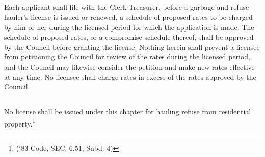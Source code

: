 \subsection{}
Each applicant shall file with the Clerk-Treasurer, before a garbage and refuse hauler’s license is issued or renewed, a schedule of proposed rates to be charged by him or her during the licensed period for which the application is made.  The schedule of proposed rates, or a compromise schedule thereof, shall be approved by the Council before granting the license.  Nothing herein shall prevent a licensee from petitioning the Council for review of the rates during the licensed period, and the Council may likewise consider the petition and make new rates effective at any time.  No licensee shall charge rates in excess of the rates approved by the Council.
\subsection{}
No license shall be issued under this chapter for hauling refuse from residential property.\footnote{(‘83 Code, SEC. 6.51, Subd. 4)}
